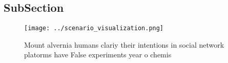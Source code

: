 \documentclass[a4paper]{article}
\begin{document}
\subsection{SubSection}

\begin{figure}
\centering
\texttt{[image: ../scenario\_visualization.png]}
\caption{Mount alvernia humans clariy their intentions in social network platorms have False experiments year o chemis
}
\end{figure}
 
\end{document}
